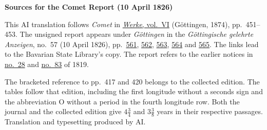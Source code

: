 \clearpage\thispagestyle{empty}
\begin{center}\textbf{Sources for the Comet Report (10 April 1826)}\end{center}
\noindent This AI translation follows \textit{Comet} in \href{https://gdz.sub.uni-goettingen.de/id/PPN236007467}{\textit{Werke}, vol.~VI} (Göttingen, 1874), pp.~451--453. The unsigned report appears under \textit{Göttingen} in the \textit{Göttingische gelehrte Anzeigen}, no.~57 (10 April 1826), pp.~\href{https://api.digitale-sammlungen.de/iiif/image/v2/bsb10538703_00567/full/1550,/0/default.jpg}{561}, \href{https://api.digitale-sammlungen.de/iiif/image/v2/bsb10538703_00568/full/1550,/0/default.jpg}{562}, \href{https://api.digitale-sammlungen.de/iiif/image/v2/bsb10538703_00569/full/1550,/0/default.jpg}{563}, \href{https://api.digitale-sammlungen.de/iiif/image/v2/bsb10538703_00570/full/1550,/0/default.jpg}{564} and \href{https://api.digitale-sammlungen.de/iiif/image/v2/bsb10538703_00571/full/1550,/0/default.jpg}{565}. The links lead to the Bavarian State Library’s copy. The report refers to the earlier notices in \hyperlink{native-422}{no.~28} and \hyperlink{native-425}{no.~83} of 1819.
\par\smallskip\noindent The bracketed reference to pp.~417 and 420 belongs to the collected edition. The tables follow that edition, including the first longitude without a seconds sign and the abbreviation O without a period in the fourth longitude row. Both the journal and the collected edition give $4\frac{3}{4}$ and $3\frac{3}{8}$ years in their respective passages. Translation and typesetting produced by AI.
\clearpage
